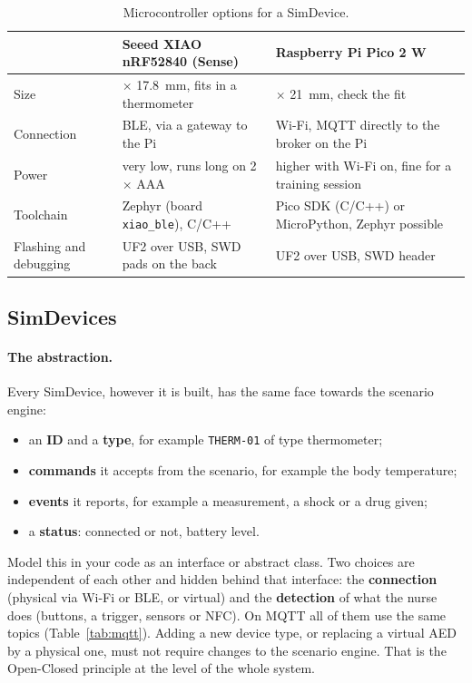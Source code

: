 \documentclass[11pt,a4paper]{article}
\begin{document}
\begin{table}[h]
\centering
\small
\begin{tabularx}{\linewidth}{@{}l >{\raggedright\arraybackslash}X >{\raggedright\arraybackslash}X@{}}
\toprule
 & \textbf{Seeed XIAO nRF52840 (Sense)} & \textbf{Raspberry Pi Pico 2 W} \\
\midrule
Size & 21 $\times$ 17.8~mm, fits in a thermometer & 51 $\times$ 21~mm, check the fit \\
Connection & BLE, via a gateway to the Pi & Wi-Fi, MQTT directly to the broker on the Pi \\
Power & very low, runs long on 2 $\times$ AAA & higher with Wi-Fi on, fine for a training session \\
Toolchain & Zephyr (board \texttt{xiao\_ble}), C/C++ & Pico SDK (C/C++) or MicroPython, Zephyr possible \\
Flashing and debugging & UF2 over USB, SWD pads on the back & UF2 over USB, SWD header \\
\bottomrule
\end{tabularx}
\caption{Microcontroller options for a SimDevice.}
\label{tab:mcu}
\end{table}

\subsection{SimDevices}
\paragraph{The abstraction.} Every SimDevice, however it is built, has the
same face towards the scenario engine:
\begin{itemize}
  \item an \textbf{ID} and a \textbf{type}, for example \texttt{THERM-01} of
        type thermometer;
  \item \textbf{commands} it accepts from the scenario, for example the body
        temperature;
  \item \textbf{events} it reports, for example a measurement, a shock or a
        drug given;
  \item a \textbf{status}: connected or not, battery level.
\end{itemize}
Model this in your code as an interface or abstract class. Two choices are
independent of each other and hidden behind that interface: the
\textbf{connection} (physical via Wi-Fi or BLE, or virtual) and the \textbf{detection}
of what the nurse does (buttons, a trigger, sensors or NFC). On MQTT all of them use the same topics (Table~\ref{tab:mqtt}).
Adding a new device type, or replacing a virtual AED by a physical one, must
not require changes to the scenario engine. That is the Open-Closed principle
at the level of the whole system.
\end{document}
